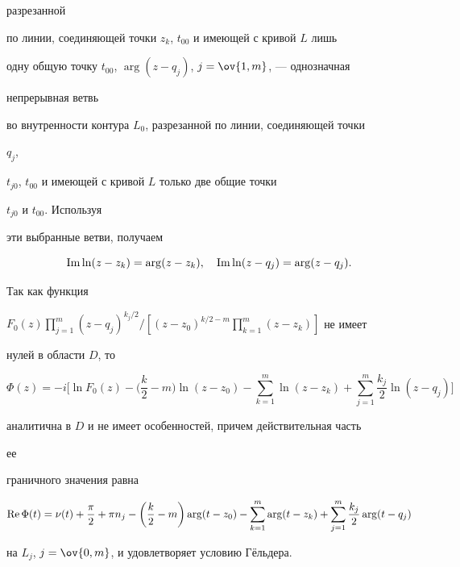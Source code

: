 разрезанной 


по линии, соединяющей точки $z_k$, $t_{00}$ и имеющей с кривой $L$ лишь 


одну общую точку $t_{00}$, $\arg(z-q_j)$, $j=\ov{1,m}$, --- однозначная 


непрерывная ветвь 


во внутренности контура $L_0$, разрезанной по линии, соединяющей точки 


$q_j$, 


$t_{j0}$, $t_{00}$ и имеющей с кривой $L$ только две общие точки 


$t_{j0}$ и $t_{00}$. Используя 


эти выбранные ветви, получаем 


$$ 


\im\ln(z-z_k)=\arg(z-z_k),\quad 


\im\ln(z-q_j)=\arg(z-q_j). 


$$ 


Так как функция 


$F_0(z)\prod\limits^m_{j=1}(z-q_j)^{k_j/2}/[(z-z_0)^{k/2-m} 


\prod\limits^m_{k=1}(z-z_k)]$ не имеет 


нулей в области $D$, то 


\begin{equation} 


\Phi(z)=-i\bigg[\ln F_0(z)-\bigg(\frac{k}{2}-m\bigg) 


\ln(z-z_0)-\sum^m_{k=1}\ln(z-z_k)+ 


\sum^m_{j=1}\frac{k_j}{2}\ln(z-q_j)\bigg] 


\end{equation} 


аналитична в $D$ и не имеет особенностей, причем действительная часть 


ее 


граничного значения равна 


\begin{equation} 


\re\Phi(t)=\nu(t)+\frac{\pi}{2}+\pi n_j-\bigg( 


\frac{k}{2}-m\bigg)\arg(t-z_0)- 


\sum^m_{k=1}\arg(t-z_k)+\sum^m_{j=1}\frac{k_j}{2} 


\arg(t-q_j) 


\end{equation} 


на $L_j$, $j=\ov{0,m}$, и удовлетворяет условию Г\"ельдера. 


